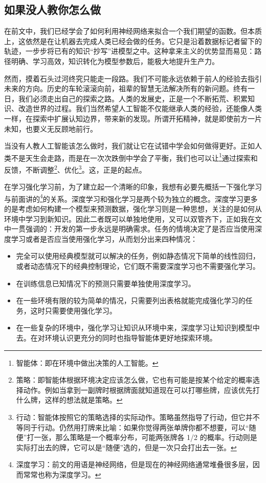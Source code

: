 \newpage

\subsection{如果没人教你怎么做}

在前文中，我们已经学会了如何利用神经网络来拟合一个我们期望的函数。但本质上，这依然是在让机器去完成人类已经会做的任务。它只是沿着数据标记者留下的轨迹，一步步将已有的知识“抄写”进模型之中。这种拿来主义的优势显而易见：路径明确、学习高效，知识转化为模型参数后，能极大地提升生产力。

然而，摸着石头过河终究只能走一段路。我们不可能永远依赖于前人的经验去指引未来的方向。历史的车轮滚滚向前，祖辈的智慧无法解决所有的新问题。终有一日，我们必须走出自己的探索之路。人类的发展史，正是一个不断拓荒、积累知识、改造世界的过程。我们当然希望人工智能不仅能继承人类的经验，还能像人类一样，在探索中扩展认知边界，带来新的发现。所谓开拓精神，就是即使前方一片未知，也要义无反顾地前行。

当没有人教人工智能该怎么做时，我们就让它在试错中学会如何做得更好。正如人类不是天生会走路，而是在一次次跌倒中学会了平衡，我们也可以让\footnote{智能体：即在环境中做出决策的人工智能。}通过探索和反馈，不断调整\footnote{策略：即智能体根据环境决定应该怎么做，它也有可能是按某个给定的概率选择动作。例如当拿到一副牌时根据牌面就知道现在可以打哪些牌，应该优先打什么牌，这样的想法就是策略。}、优化\footnote{行动：智能体按照它的策略选择的实际动作。策略虽然指导了行动，但它并不等同于行动。仍然用打牌来比喻：如果你觉得两张单牌你都不想要，可以“随便”打一张，那么策略是一个概率分布，可能两张牌各 1/2 的概率。行动则是实际打出去的牌，它可以是“随便”选的，但是一次只会打出去一张。}。这，正是的起点。

在学习强化学习前，为了建立起一个清晰的印象，我想有必要先概括一下强化学习与前面讲的\footnote{深度学习：前文的用语是神经网络，但是现在的神经网络通常堆叠很多层，因而常常也称为深度学习。}的关系。深度学习和强化学习是两个较为独立的概念。深度学习更多的是考虑如何构建一个模型来预测数据，强化学习则是一种思想，关注的是如何从环境中学习到新知识。因此二者既可以单独地使用，又可以双管齐下，正如我在文中一贯强调的：开发的第一步永远是明确需求。任务的情境决定了是否应当使用深度学习或者是否应当使用强化学习，从而划分出来四种情况：
\begin{itemize}
    \item 完全可以使用经典模型就可以解决的任务，例如静态情况下简单的线性回归，或者动态情况下的经典控制理论，它们既不需要深度学习也不需要强化学习。
    \item 在训练信息已知情况下的预测只需要单独使用深度学习。
    \item 在一些环境有限的较为简单的情况，只需要列出表格就能完成强化学习的任务，这时只需要使用强化学习。
    \item 在一些复杂的环境中，强化学习让知识从环境中来，深度学习让知识到模型中去。在对环境认识更充分的同时也指导智能体更好地探索环境。
\end{itemize}

